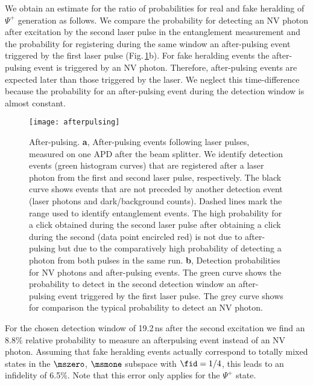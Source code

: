 We obtain an estimate for the ratio of probabilities for real and fake heralding of $\Psi^+$ generation as follows. We compare the probability for detecting an NV photon after excitation by the second laser pulse in the entanglement measurement and the probability for registering during the same window an after-pulsing event triggered by the first laser pulse (Fig.\,\ref{fig:afterpulsing}b). For fake heralding events the after-pulsing event is triggered by an NV photon. Therefore, after-pulsing events are expected later than those triggered by the laser. We neglect this time-difference because the probability for an after-pulsing event during the detection window is almost constant.

\begin{figure}[h]
    \centering
    \texttt{[image: afterpulsing]}
    \caption{After-pulsing. \textbf{a}, After-pulsing events following laser pulses, measured on one APD after the beam splitter. We identify detection events (green histogram curves) that are registered after a laser photon from the first and second laser pulse, respectively. The black curve shows events that are not preceded by another detection event (laser photons and dark/background counts). Dashed lines mark the range used to identify entanglement events. The high probability for a click obtained during the second laser pulse after obtaining a click during the second (data point encircled red) is not due to after-pulsing but due to the comparatively high probability of detecting a photon from both pulses in the same run. \textbf{b}, Detection probabilities for NV photons and after-pulsing events. The green curve shows the probability to detect in the second detection window an after-pulsing event triggered by the first laser pulse. The grey curve shows for comparison the typical probability to detect an NV photon.}
	\label{fig:afterpulsing}
\end{figure}

For the chosen detection window of 19.2\,ns after the second excitation we find an 8.8\% relative probability to measure an afterpulsing event instead of an NV photon. Assuming that fake heralding events actually correspond to totally mixed states in the $\mszero$, $\msmone$ subspace with $\fid=1/4$, this leads to an infidelity of 6.5\%. Note that this error only applies for the $\Psi^+$ state.


